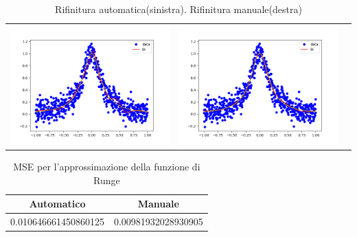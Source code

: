 \documentclass[../main.tex]{subfiles}
\begin{document}
\begin{table}
    \centering
    \caption{Rifinitura automatica(sinistra). Rifinitura manuale(destra)\label{tab:runge_fit}}
        \begin{tabular}{ccc}
             \includegraphics[width=0.45\linewidth]{Immagini/esempi/runge_auto.png}
            & \includegraphics[width=0.45\linewidth]{Immagini/esempi/runge_mano.png}\\[-4pt]
        \end{tabular}%
\end{table}

\begin{table}[h!]
    \centering
     \begin{tabular}{||c c ||} 
     \hline
     Automatico & Manuale \\ [0.5ex] 
     \hline\hline
     0.010646661450860125 & 0.00981932028930905 \\  [1ex] 
     \hline
     \end{tabular}
     \label{tab:runge_mse}
     \caption{MSE per l'approssimazione della funzione di Runge}
    \end{table}
\end{document}
